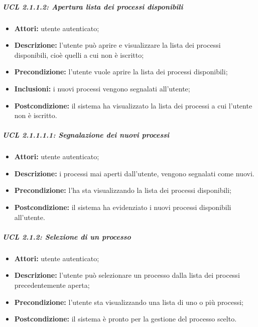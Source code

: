 \subparagraph{UCL 2.1.1.2: Apertura lista dei processi disponibili}
\begin{itemize}
\item \textbf{Attori:} utente autenticato;
\item \textbf{Descrizione:} l'utente può aprire e visualizzare la lista dei processi disponibili, cioè quelli a cui non è iscritto;
\item \textbf{Precondizione:} l'utente vuole aprire la lista dei processi disponibili;
\item \textbf{Inclusioni:} i nuovi processi vengono segnalati all'utente;
\item \textbf{Postcondizione:} il sistema ha visualizzato la lista dei processi a cui l'utente non è iscritto.
\end{itemize}

\subparagraph{UCL 2.1.1.1.1: Segnalazione dei nuovi processi}
\begin{itemize}
\item \textbf{Attori:} utente autenticato;
\item \textbf{Descrizione:} i processi mai aperti dall'utente, vengono segnalati come nuovi. 
\item \textbf{Precondizione:} l'ha sta visualizzando la lista dei processi disponibili;
\item \textbf{Postcondizione:} il sistema ha evidenziato i nuovi processi disponibili all'utente.
\end{itemize}

\subparagraph{UCL 2.1.2: Selezione di un processo}
\begin{itemize}
\item \textbf{Attori:} utente autenticato;
\item \textbf{Descrizione:} l'utente può selezionare un processo dalla lista dei processi precedentemente aperta;
\item \textbf{Precondizione:} l'utente sta visualizzando una lista di uno o più processi;
\item \textbf{Postcondizione:} il sistema è pronto per la gestione del processo scelto.
\end{itemize}

